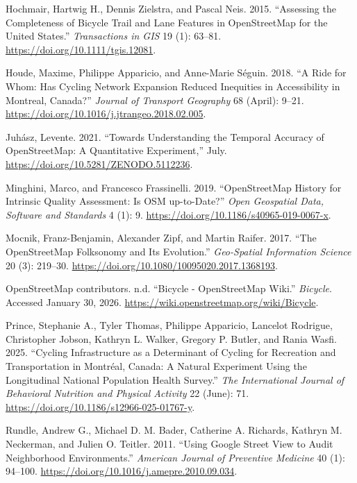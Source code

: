 \documentclass[
]{article}
\newlength{\cslhangindent}
\newenvironment{CSLReferences}[2] %
 {\begin{list}{}{%
  \setlength{\itemindent}{0pt}
  \setlength{\leftmargin}{0pt}
  \setlength{\parsep}{0pt}
  \ifodd #1
   \setlength{\leftmargin}{\cslhangindent}
   \setlength{\itemindent}{-1\cslhangindent}
  \fi
  \setlength{\itemsep}{#2\baselineskip}}}
 {\end{list}}
\begin{document}
\begin{CSLReferences}{1}{0}
Hochmair, Hartwig H., Dennis Zielstra, and Pascal Neis. 2015.
{``Assessing the {Completeness} of {Bicycle} {Trail} and {Lane}
{Features} in {OpenStreetMap} for the {United} {States}.''}
\emph{Transactions in GIS} 19 (1): 63--81.
\url{https://doi.org/10.1111/tgis.12081}.

Houde, Maxime, Philippe Apparicio, and Anne-Marie Séguin. 2018. {``A
Ride for Whom: {Has} Cycling Network Expansion Reduced Inequities in
Accessibility in {Montreal}, {Canada}?''} \emph{Journal of Transport
Geography} 68 (April): 9--21.
\url{https://doi.org/10.1016/j.jtrangeo.2018.02.005}.

Juhász, Levente. 2021. {``Towards Understanding the Temporal Accuracy of
{OpenStreetMap}: {A} Quantitative Experiment,''} July.
\url{https://doi.org/10.5281/ZENODO.5112236}.

Minghini, Marco, and Francesco Frassinelli. 2019. {``{OpenStreetMap}
History for Intrinsic Quality Assessment: {Is} {OSM} up-to-Date?''}
\emph{Open Geospatial Data, Software and Standards} 4 (1): 9.
\url{https://doi.org/10.1186/s40965-019-0067-x}.

Mocnik, Franz-Benjamin, Alexander Zipf, and Martin Raifer. 2017. {``The
{OpenStreetMap} Folksonomy and Its Evolution.''} \emph{Geo-Spatial
Information Science} 20 (3): 219--30.
\url{https://doi.org/10.1080/10095020.2017.1368193}.

OpenStreetMap contributors. n.d. {``Bicycle - {OpenStreetMap} {Wiki}.''}
\emph{Bicycle}. Accessed January 30, 2026.
\url{https://wiki.openstreetmap.org/wiki/Bicycle}.

Prince, Stephanie A., Tyler Thomas, Philippe Apparicio, Lancelot
Rodrigue, Christopher Jobson, Kathryn L. Walker, Gregory P. Butler, and
Rania Wasfi. 2025. {``Cycling Infrastructure as a Determinant of Cycling
for Recreation and Transportation in {Montréal}, {Canada}: A Natural
Experiment Using the Longitudinal National Population Health Survey.''}
\emph{The International Journal of Behavioral Nutrition and Physical
Activity} 22 (June): 71.
\url{https://doi.org/10.1186/s12966-025-01767-y}.

Rundle, Andrew G., Michael D. M. Bader, Catherine A. Richards, Kathryn
M. Neckerman, and Julien O. Teitler. 2011. {``Using {Google} {Street}
{View} to {Audit} {Neighborhood} {Environments}.''} \emph{American
Journal of Preventive Medicine} 40 (1): 94--100.
\url{https://doi.org/10.1016/j.amepre.2010.09.034}.


\end{CSLReferences}
\end{document}
